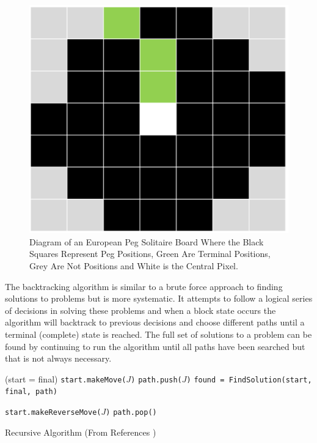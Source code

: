 \documentclass[a4paper]{article}
\begin{document}
\begin{figure}[H]
	\centering
	\label{board}
	\includegraphics[width=.50\textwidth,scale=.50]{images/board}
	\caption{Diagram of an European Peg Solitaire Board Where the
				Black Squares Represent Peg Positions,
				Green Are Terminal Positions,
				Grey Are Not Positions and
				White is the Central Pixel.
			}
\end{figure}

\noindent The backtracking algorithm is similar to a brute force approach to finding solutions to problems but is more systematic. It attempts to follow a logical series of decisions in solving these problems and when a block state occurs the algorithm will backtrack to previous decisions and choose different paths until a terminal (complete) state is reached. The full set of solutions to a problem can be found by continuing to run the algorithm until all paths have been searched but that is not always necessary.

\begin{algorithm}[H]
	\begin{algorithmic}[1]
				\State \Return (start = final)
			\Else 
				\For{\texttt{each jump $J \in$ [0,n) x [0,m) x \{NORTH,EAST,SOUTH,WEST\}}}
			        	\State \texttt{start.makeMove($J$)}
			        	\State \texttt{path.push($J$)}
			        	\State \texttt{found = FindSolution(start, final, path)}

			        		\State {}
			        	\Else
			        		\State \texttt{start.makeReverseMove($J$)}
			        		\State \texttt{path.pop()}
			        	\EndIf
					\EndIf
		      	\EndFor
		      	\State {}
			\EndIf 
		\EndProcedure
	\end{algorithmic}
	\caption{Recursive Algorithm (From References \cite{lab5})}\label{euclid}
\end{algorithm}
\end{document}
